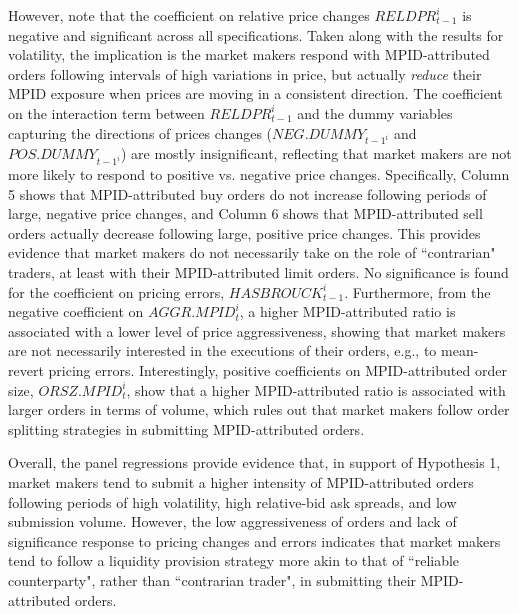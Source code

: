 \documentclass{article}
\begin{document}
However, note that the coefficient on relative price changes $RELDPR_{t-1}^i$ is negative and significant across all specifications. Taken along with the results for volatility, the implication is the market makers respond with MPID-attributed orders following intervals of high variations in price, but actually \emph{reduce} their MPID exposure when prices are moving in a consistent direction. The coefficient on the interaction term between $RELDPR_{t-1}^i$ and the dummy variables capturing the directions of prices changes ($NEG.DUMMY_{t-1^i}$ and $POS.DUMMY_{t-1^i}$) are mostly insignificant, reflecting that market makers are not more likely to respond to positive vs. negative price changes. Specifically, Column 5 shows that MPID-attributed buy orders do not increase following periods of large, negative price changes, and Column 6 shows that MPID-attributed sell orders actually decrease following large, positive price changes. This provides evidence that market makers do not necessarily take on the role of ``contrarian" traders, at least with their MPID-attributed limit orders. No significance is found for the coefficient on pricing errors, $HASBROUCK_{t-1}^i$. Furthermore, from the negative coefficient on $AGGR.MPID_t^i$, a higher MPID-attributed ratio is associated with a lower level of price aggressiveness, showing that market makers are not necessarily interested in the executions of their orders, e.g., to mean-revert pricing errors. Interestingly, positive coefficients on MPID-attributed order size, $ORSZ.MPID_t^i$, show that a higher MPID-attributed ratio is associated with larger orders in terms of volume, which rules out that market makers follow order splitting strategies in submitting MPID-attributed orders.

Overall, the panel regressions provide evidence that, in support of Hypothesis 1, market makers tend to submit a higher intensity of MPID-attributed orders following periods of high volatility, high relative-bid ask spreads, and low submission volume. However, the low aggressiveness of orders and lack of significance response to pricing changes and errors indicates that market makers tend to follow a liquidity provision strategy more akin to that of ``reliable counterparty", rather than ``contrarian trader", in submitting their MPID-attributed orders.

\end{document}
